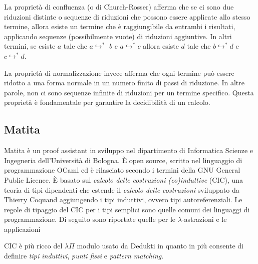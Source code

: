 \documentclass[12pt,a4paper]{mimosis}
\begin{document}
La proprietà di confluenza (o di Church-Rosser) afferma che se ci sono due riduzioni distinte o sequenze di riduzioni
che possono essere applicate allo stesso termine, allora esiste un termine che
è raggiungibile da entrambi i risultati, applicando sequenze (possibilmente vuote)
di riduzioni aggiuntive. In altri termini, se esiste $a$ tale che $a \hookrightarrow^*$
$b$ e $a \hookrightarrow^*c$ allora esiste $d$ tale che $b \hookrightarrow^*d$ e
$c \hookrightarrow^* d$.

La proprietà di normalizzazione invece afferma che ogni termine può essere 
ridotto a una forma normale in un numero finito di passi di riduzione. In altre
parole, non ci sono sequenze infinite di riduzioni per un termine specifico. 
Questa proprietà è fondamentale per garantire la decidibilità di un calcolo. 


\subsection{Matita}
Matita è un  proof assistant in sviluppo nel dipartimento di Informatica Scienze
e Ingegneria dell'Università di Bologna. È open source, scritto nel linguaggio di
programmazione OCaml ed è rilasciato secondo i termini della GNU General Public Licence.
È basato sul \textit{calcolo delle costruzioni (co)induttive} (CIC), una teoria di tipi
dipendenti che estende il \textit{calcolo delle costruzioni} sviluppato da
Thierry Coquand aggiungendo i tipi induttivi, ovvero tipi autoreferenziali.
Le regole di tipaggio del CIC per i tipi semplici sono quelle comuni dei linguaggi
di programmazione. Di seguito sono riportate quelle per le  $\lambda$-astrazioni
e le applicazioni 

\begin{prooftree}
\end{prooftree}

\begin{prooftree}
\end{prooftree}


CIC è più ricco del $\lambda\Pi$ modulo usato da Dedukti in quanto in più consente di definire 
\textit{tipi induttivi}, \textit{punti fissi} e \textit{pattern matching}.
\end{document}
